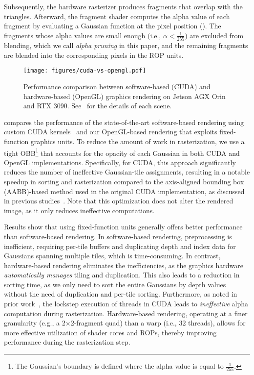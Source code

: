 Subsequently, the hardware rasterizer produces fragments that overlap with the
triangles. Afterward, the fragment shader computes the alpha value of each
fragment by evaluating a Gaussian function at the pixel position
(). The fragments whose alpha values are small enough
(i.e., $\alpha<\frac{1}{255}$) are excluded from blending, which we call
\emph{alpha pruning} in this paper, and the remaining fragments are blended
into the corresponding pixels in the ROP units.

\begin{figure}[t]
  \centering
  \texttt{[image: figures/cuda-vs-opengl.pdf]}
  \caption{Performance comparison between software-based (CUDA) and hardware-based (OpenGL) graphics rendering on Jetson AGX Orin and RTX 3090. See~ for the details of each scene.}
  \vspace{-0.20in}
  \label{fig:cuda-vs-opengl}
\end{figure}

%
 compares the performance of the state-of-the-art
software-based rendering using custom CUDA kernels~\cite{ker:kop23} and our
OpenGL-based rendering that exploits fixed-function graphics units.
%
To reduce the amount of work in rasterization, we use a tight OBB\footnote{The
Gaussian's boundary is defined where the alpha value is equal to
$\frac{1}{255}$.} that accounts for the opacity of each Gaussian in both CUDA
and OpenGL implementations. Specifically, for CUDA, this approach significantly
reduces the number of ineffective Gaussian-tile assignments, resulting in a
notable speedup in sorting and rasterization compared to the axis-aligned
bounding box (AABB)-based method used in the original CUDA implementation, as
discussed in previous studies~\cite{lee:lee24,rad:ste24}.
%
Note that this optimization does not alter the rendered image, as it only
reduces ineffective computations.

Results show that using fixed-function units generally offers better
performance than software-based rendering.
%
In software-based rendering, preprocessing is inefficient, requiring per-tile
buffers and duplicating depth and index data for Gaussians spanning multiple
tiles, which is time-consuming.
%
In contrast, hardware-based rendering eliminates the inefficiencies, as the
graphics hardware \emph{automatically manages} tiling and duplication.
%
This also leads to a reduction in sorting time, as we only need to sort the
entire Gaussians by depth values without the need of duplication and per-tile
sorting.
%
Furthermore, as noted in prior work~\cite{lee:lee24}, the lockstep execution of
threads in CUDA leads to \emph{ineffective} alpha computation during
rasterization.
%
Hardware-based rendering, operating at a finer granularity (e.g., a
2$\times$2-fragment quad) than a warp (i.e., 32 threads), allows for more
effective utilization of shader cores and ROPs, thereby improving performance
during the rasterization step.

